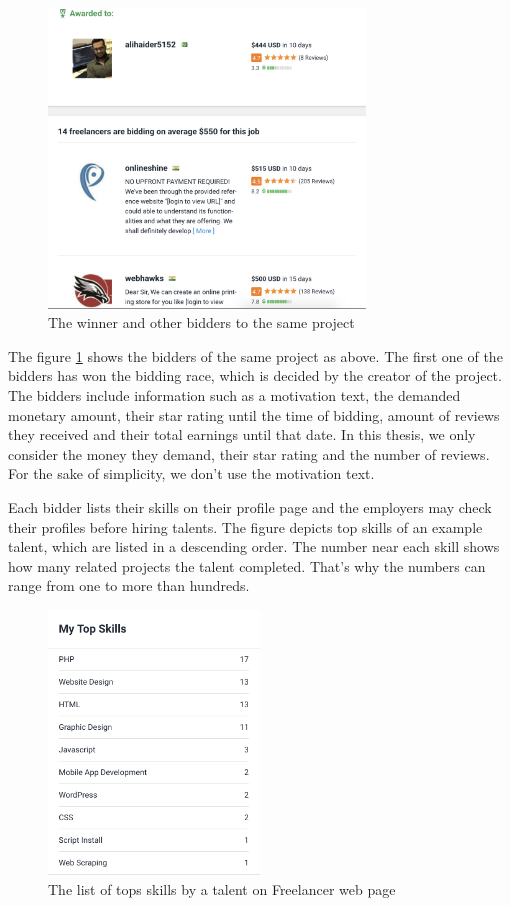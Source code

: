 \begin{figure}[h]
	\centering
	\includegraphics[width=0.75\textwidth]{figures/FreelancerTalentExample.png}
	\caption{The winner and other bidders to the same project}
	\label{fig:freelancer-example-talent}
\end{figure}


The figure \ref{fig:freelancer-example-talent} shows the bidders of the same project as above. The first one of the bidders has won the bidding race, which is decided by the creator of the project. The bidders include information such as a motivation text, the demanded monetary amount, their star rating until the time of bidding, amount of reviews they received and their total earnings until that date. In this thesis, we only consider the money they demand, their star rating and the number of reviews. For the sake of simplicity, we don't use the motivation text.


Each bidder lists their skills on their profile page and the employers may check their profiles before hiring talents. The figure depicts top skills of an example talent, which are listed in a descending order. The number near each skill shows how many related projects the talent completed. That's why the numbers can range from one to more than hundreds. 


\begin{figure}[h]
	\centering
	\includegraphics[width=0.5\textwidth]{figures/FreelancerTalentSkills.png}
	\caption{The list of tops skills by a talent on Freelancer web page}
	\label{fig:freelancer-talent-talent}
\end{figure}


